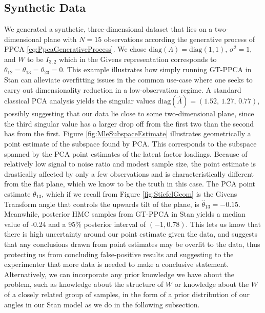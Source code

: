 \documentclass{article}
\begin{document}
\subsection{Synthetic Data}
We generated a synthetic, three-dimensional dataset that lies on a two-dimensional plane with $N =15$ observations according the generative process of PPCA \ref{eq:PpcaGenerativeProcess}. We chose $\mathrm{diag}(\Lambda) =\mathrm{diag}(1, 1)$, $\sigma^2 = 1$, and $W$ to be $I_{3,2}$ which in the Givens representation corresponds to $\theta_{12} = \theta_{13} = \theta_{23} = 0$. This example illustrates how simply running GT-PPCA in Stan can alleviate overfitting issues in the common use-case where one seeks to carry out dimensionality reduction in a low-observation regime. A standard classical PCA analysis yields the singular values $\mathrm{diag}(\hat{\Lambda}) = (1.52,\, 1.27,\, 0.77)$,  possibly suggesting that our data lie close to some two-dimensional plane, since the third singular value has a larger drop off from the first two than the second has from the first. Figure \ref{fig:MleSubspaceEstimate} illustrates geometrically a point estimate of the subspace found by PCA. This corresponds to the subspace spanned by the PCA point estimates of the latent factor loadings. Because of relatively low signal to noise ratio and modest sample size, the point estimate is drastically affected by only a few observations and is characteristically different from the flat plane, which we know to be the truth in this case. The PCA point estimate $\theta_{13}$, which if we recall from Figure \ref{fig:StiefelGeom} is the Givens Transform angle that controls the upwards tilt of the plane, is $\hat{\theta}_{13} = -0.15$. Meanwhile, posterior HMC samples from GT-PPCA in Stan yields a median value of -0.24 and a 95\% posterior interval of $(-1, 0.78)$. This lets us know that there is high uncertainty around our point estimate given the data, and suggests that any conclusions drawn from point estimates may be overfit to the data, thus protecting us from concluding false-positive results and suggesting to the experimenter that more data is needed to make a conclusive statement. Alternatively, we can incorporate any prior knowledge we have about the problem, such as knowledge about the structure of $W$ or knowledge about the $W$ of a closely related group of samples, in the form of a prior distribution of our angles in our Stan model as we do in the following subsection.
\end{document}
